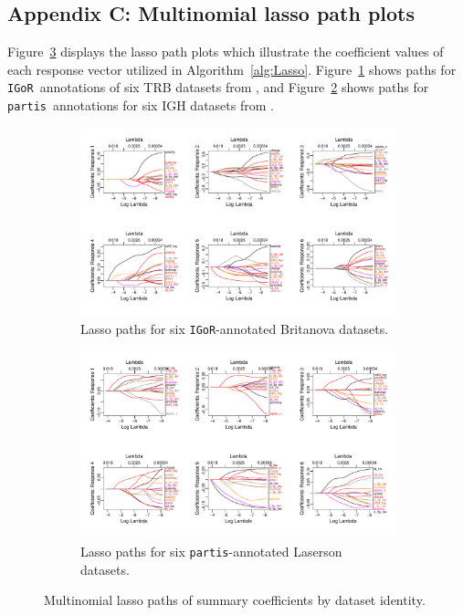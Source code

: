 \documentclass{article}
\newcommand{\partis}{\texttt{partis}}
\newcommand{\igor}{\texttt{IGoR}}
\begin{document}
\subsection*{Appendix C: Multinomial lasso path plots}
Figure~\ref{fig:LassoPaths} displays the lasso path plots which illustrate the coefficient values of each response vector utilized in Algorithm~\ref{alg:Lasso}.
Figure~\ref{fig:IgorLassoPaths} shows paths for \igor\ annotations of six TRB datasets from \cite{Britanova2016-iw}, and Figure~\ref{fig:PartisLassoPaths} shows paths for \partis\ annotations for six IGH datasets from \cite{Laserson2014-dx}.
\begin{figure}
	\begin{subfigure}{\linewidth}
    	\includegraphics[width=\linewidth]{Figures/Lasso/igor_lasso_paths.pdf}
		\caption{Lasso paths for six \igor-annotated Britanova datasets.}
		\label{fig:IgorLassoPaths}
    \end{subfigure}
    \begin{subfigure}{\linewidth}
    	\includegraphics[width=\linewidth]{Figures/Lasso/partis_lasso_paths.pdf}
		\caption{Lasso paths for six \partis-annotated Laserson datasets.}
		\label{fig:PartisLassoPaths}
    \end{subfigure}
    \caption{Multinomial lasso paths of summary coefficients by dataset identity.}
    \label{fig:LassoPaths}
\end{figure}
\end{document}
